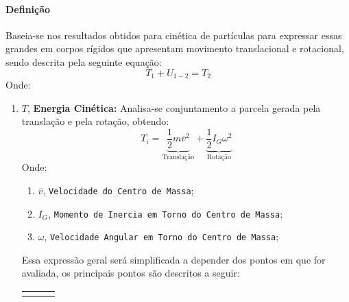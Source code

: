 \documentclass{article}
\begin{document}
            \paragraph{Definição}Baseia-se nos resultados obtidos para cinética de partículas para expressar essas grandes em corpos rígidos que apresentam movimento translacional e rotacional, sendo descrita pela seguinte equação:
                \begin{equation}
                    \boxed{
                        T_{1} + U_{1-2} = T_{2}
                    }
                \end{equation}
            Onde:
                \begin{enumerate}[rightmargin = \leftmargin, noitemsep]
                    \item $T$, \textbf{Energia Cinética:} Analisa-se conjuntamento a parcela gerada pela translação e pela rotação, obtendo:
                        \begin{equation}
                            \boxed{
                                T_{i} = 
                                \underbrace{
                                    \frac{1}{2} m\overline{v}^{2}
                                }_{\text{Translação}} + 
                                \underbrace{
                                    \frac{1}{2}I_{G}\omega^{2}
                                }_{\text{Rotação}}
                            }
                        \end{equation}
                    Onde:
                        \begin{enumerate}[rightmargin = \leftmargin, noitemsep]
                            \item $\overline{v}$, \texttt{Velocidade do Centro de Massa};
                            \item $I_{G}$, \texttt{Momento de Inercia em Torno do Centro de Massa};
                            \item $\omega$, \texttt{Velocidade Angular em Torno do Centro de Massa};
                        \end{enumerate}
                    Essa expressão geral será simplificada a depender dos pontos em que for avaliada, os principais pontos são descritos a seguir:
                        \begin{center}
                            \centering
                            \begin{tabularx}{0.8\textwidth}{@{}XXX@{}}
                                \begin{equation}

\end{equation}
\end{tabularx}
\end{center}
\end{enumerate}
\end{document}
